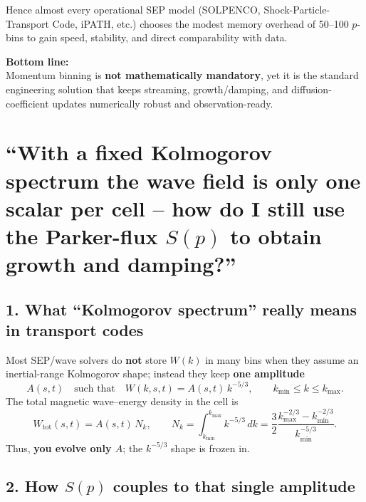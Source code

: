 Hence almost every operational SEP model (SOLPENCO, Shock-Particle-Transport Code, iPATH, etc.) chooses the modest memory overhead of 50–100 \(p\)-bins to gain speed, stability, and direct comparability with data.

\bigskip

\noindent\textbf{Bottom line:} \\
Momentum binning is \textbf{not mathematically mandatory}, yet it is the standard engineering solution that keeps streaming, growth/damping, and diffusion-coefficient updates numerically robust and observation-ready.


\section*{``With a fixed Kolmogorov spectrum the wave field is only one scalar per cell – how do I still use the Parker-flux $S(p)$ to obtain growth and damping?''}

\subsection*{1. What “Kolmogorov spectrum” really means in transport codes}

Most SEP/wave solvers do \textbf{not} store \( W(k) \) in many bins when they assume an inertial-range Kolmogorov shape; instead they keep \textbf{one amplitude}
\[
A(s,t) \quad \text{such that} \quad 
W(k,s,t) = A(s,t)\,k^{-5/3}, \qquad k_{\min} \leq k \leq k_{\max}. \tag{1}
\]
The total magnetic wave–energy density in the cell is
\[
W_{\text{tot}}(s,t) = A(s,t)\,N_k,
\qquad
N_k = \int_{k_{\min}}^{k_{\max}} k^{-5/3}\,dk
     = \frac{3}{2} \frac{k_{\max}^{-2/3} - k_{\min}^{-2/3}}{k_{\min}^{-5/3}}. \tag{2}
\]
Thus, \textbf{you evolve only \(A\)}; the \(k^{-5/3}\) shape is frozen in.

\subsection*{2. How \(S(p)\) couples to that single amplitude}

